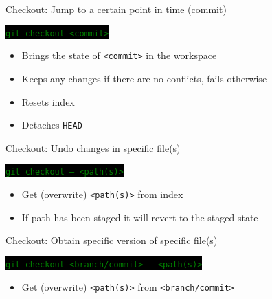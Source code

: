 \documentclass[
14pt,
aspectratio=169,
usenames,
dvipsnames,
x11names]{beamer}
\newcommand{\code}[1]{{\small\colorbox{black}{\textcolor{green}{\texttt{#1}}}}}
\begin{document}



\begin{frame}{Checkout: Jump to a certain point in time (commit)}

  \code{git checkout <commit>}
  \begin{itemize}
  \item Brings the state of \texttt{<commit>} in the workspace
  \item Keeps any changes if there are no conflicts, fails otherwise
  \item Resets index
  \item Detaches \texttt{HEAD}
  \end{itemize}

\end{frame}

\begin{frame}{Checkout: Undo changes in specific file(s)}

  \code{git checkout -- <path(s)>}
  \begin{itemize}
  \item Get (overwrite) \texttt{<path(s)>} from \alert{index}
  \item If path has been \alert{staged} it will revert to the \alert{staged state}
  \end{itemize}
\end{frame}

\begin{frame}{Checkout: Obtain specific version of specific file(s)}

  \code{git checkout <branch/commit> -- <path(s)>}
  \begin{itemize}
  \item Get (overwrite) \texttt{<path(s)>} from \texttt{<branch/commit>}
  \end{itemize}
\end{frame}
\end{document}
